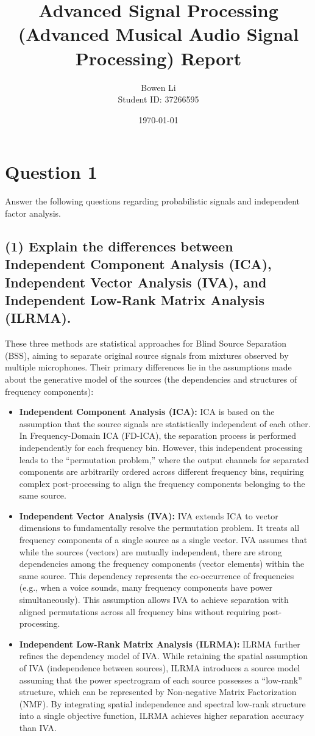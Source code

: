 \documentclass[12pt,a4paper]{article}
\title{Advanced Signal Processing\\ (Advanced Musical Audio Signal Processing) Report}
\author{Bowen Li \\ Student ID: 37266595}
\date{\today}
\begin{document}
\maketitle

\section*{Question 1}
Answer the following questions regarding probabilistic signals and independent factor analysis.

\subsection*{(1) Explain the differences between Independent Component Analysis (ICA), Independent Vector Analysis (IVA), and Independent Low-Rank Matrix Analysis (ILRMA).}

These three methods are statistical approaches for Blind Source Separation (BSS), aiming to separate original source signals from mixtures observed by multiple microphones. Their primary differences lie in the assumptions made about the generative model of the sources (the dependencies and structures of frequency components):

\begin{itemize}
    \item \textbf{Independent Component Analysis (ICA):} 
    ICA is based on the assumption that the source signals are statistically independent of each other. In Frequency-Domain ICA (FD-ICA), the separation process is performed independently for each frequency bin. However, this independent processing leads to the ``permutation problem,'' where the output channels for separated components are arbitrarily ordered across different frequency bins, requiring complex post-processing to align the frequency components belonging to the same source.
    
    \item \textbf{Independent Vector Analysis (IVA):}
    IVA extends ICA to vector dimensions to fundamentally resolve the permutation problem. It treats all frequency components of a single source as a single vector. IVA assumes that while the sources (vectors) are mutually independent, there are strong dependencies among the frequency components (vector elements) within the same source. This dependency represents the co-occurrence of frequencies (e.g., when a voice sounds, many frequency components have power simultaneously). This assumption allows IVA to achieve separation with aligned permutations across all frequency bins without requiring post-processing.
    
    \item \textbf{Independent Low-Rank Matrix Analysis (ILRMA):}
    ILRMA further refines the dependency model of IVA. While retaining the spatial assumption of IVA (independence between sources), ILRMA introduces a source model assuming that the power spectrogram of each source possesses a ``low-rank'' structure, which can be represented by Non-negative Matrix Factorization (NMF). By integrating spatial independence and spectral low-rank structure into a single objective function, ILRMA achieves higher separation accuracy than IVA.
\end{itemize}
\end{document}
